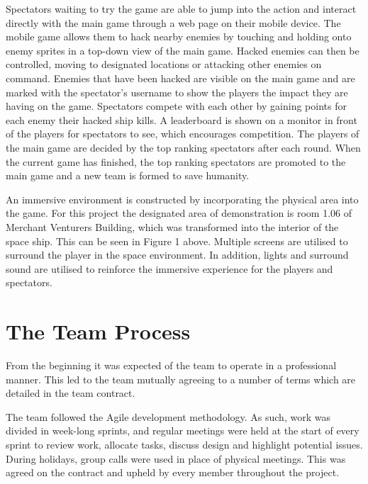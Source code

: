 \documentclass[a4paper,11pt]{article}
\begin{document}
Spectators waiting to try the game are able to jump into the action and interact directly with the main game through a web page on their mobile device. The mobile game allows them to hack nearby enemies by touching and holding onto enemy sprites in a top-down view of the main game. Hacked enemies can then be controlled, moving to designated locations or attacking other enemies on command. Enemies that have been hacked are visible on the main game and are marked with the spectator’s username to show the players the impact they are having on the game. Spectators compete with each other by gaining points for each enemy their hacked ship kills. A leaderboard is shown on a monitor in front of the players for spectators to see, which encourages competition. The players of the main game are decided by the top ranking spectators after each round. When the current game has finished, the top ranking spectators are promoted to the main game and a new team is formed to save humanity.

An immersive environment is constructed by incorporating the physical area into the game. For this project the designated area of demonstration is room 1.06 of Merchant Venturers Building, which was transformed into the interior of the space ship. This can be seen in Figure 1 above. Multiple screens are utilised to surround the player in the space environment. In addition, lights and surround sound are utilised to reinforce the immersive experience for the players and spectators. 

\section{The Team Process}

From the beginning it was expected of the team to operate in a professional manner. This led to the team mutually agreeing to a number of terms which are detailed in the team contract.

The team followed the Agile development methodology. As such, work was divided in week-long sprints, and regular meetings were held at the start of every sprint to review work, allocate tasks, discuss design and highlight potential issues. During holidays, group calls were used in place of physical meetings. This was agreed on the contract and upheld by every member throughout the project.
\end{document}
